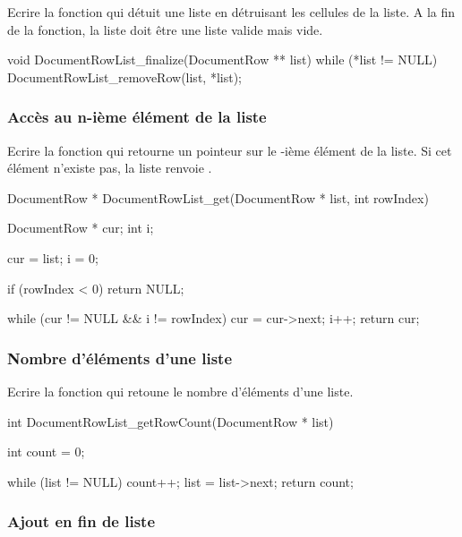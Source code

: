 Ecrire la fonction  qui détuit une liste en détruisant les cellules de la liste. A la fin de la fonction, la liste doit être une liste valide mais vide.

\begin{csourcecorrection}
void DocumentRowList_finalize(DocumentRow ** list) {
    while (*list != NULL) {
        DocumentRowList_removeRow(list, *list);
    }
}
\end{csourcecorrection}


\subsubsection{Accès au n-ième élément de la liste}

Ecrire la fonction  qui re\-tour\-ne un pointeur sur le -ième élément de la liste. Si cet élément n'existe pas, la liste renvoie .

\begin{csourcecorrection}
DocumentRow * DocumentRowList_get(DocumentRow * list, int rowIndex) {
    DocumentRow * cur;
    int i;

    cur = list;
    i = 0;
    
    if (rowIndex < 0) 
        return NULL;

    while (cur != NULL && i != rowIndex) {
        cur = cur->next;
        i++;
    }
    return cur;
}
\end{csourcecorrection}

\subsubsection{Nombre d'éléments d'une liste}

Ecrire la fonction  qui retoune le nombre d'éléments d'une liste.

\begin{csourcecorrection}
int DocumentRowList_getRowCount(DocumentRow * list) {
    int count = 0;

    while (list != NULL) {
        count++;
        list = list->next;
    }
    return count;
}
\end{csourcecorrection}

\subsubsection{Ajout en fin de liste}

